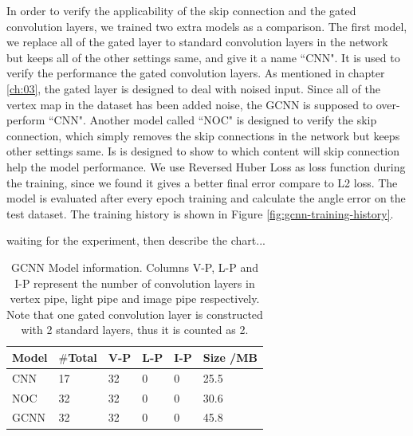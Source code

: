 \documentclass[border=15pt, multi, tikz]{article}
\newcommand{\tabhead}[1]{\textbf{#1}}
\begin{document}
In order to verify the applicability of the skip connection and the gated convolution layers, we trained two extra models as a comparison. The first model, we replace all of the gated layer to standard convolution layers in the network but keeps all of the other settings same, and give it a name ``CNN". It is used to verify the performance the gated convolution layers. As mentioned in chapter \ref{ch:03}, the gated layer is designed to deal with noised input. Since all of the vertex map in the dataset has been added noise, the GCNN is supposed to over-perform ``CNN". 
Another model called ``NOC" is designed to verify the skip connection, which simply removes the skip connections in the network but keeps other settings same. Is is designed to show to which content will skip connection help the model performance. We use Reversed Huber Loss as loss function during the training, since we found it gives a better final error compare to L2 loss. The model is evaluated after every epoch training and calculate the angle error on the test dataset. The training history is shown in Figure \ref{fig:gcnn-training-history}. 


waiting for the experiment, then describe the chart...


\begin{table}[H]
	
	\centering
	\begin{tabular}{l l l l l l }
		\tabhead{Model} & $ \# $\textbf{Total} &\textbf{ V-P} & \textbf{L-P} & \textbf{I-P} & \tabhead{Size /MB}\\
		\hline
		CNN 					& 17 & 32 & 0 & 0 & 25.5 \\
		\hline
		NOC 					& 32 & 32 & 0 & 0 & 30.6 \\
		\hline
		GCNN 					& 32 & 32 & 0 & 0 & 45.8 \\
	\end{tabular}
	\caption{GCNN Model information. Columns V-P, L-P and I-P represent the number of convolution layers in vertex pipe, light pipe and image pipe respectively. Note that one gated convolution layer is constructed with 2 standard layers, thus it is counted as 2. }	
	\label{tab:gcnn-eval-mean}
\end{table}
\end{document}
